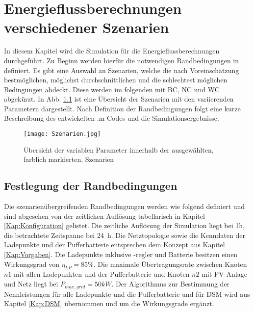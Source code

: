 \chapter{Energieflussberechnungen verschiedener Szenarien}
\label{Kap4}
	In diesem Kapitel wird die Simulation für die Energieflussberechnungen durchgeführt. Zu Beginn werden hierfür die notwendigen Randbedingungen in definiert. Es gibt eine Auswahl an Szenarien, welche die nach Voreinschätzung bestmöglichen, möglichst durchschnittlichen und die schlechtest möglichen Bedingungen abdeckt. Diese werden im folgenden mit \ac{BC}, \ac{NC} und \ac{WC} abgekürzt. In Abb. \ref{Abb:Szenarien} ist eine Übersicht der Szenarien mit den variierenden Parametern dargestellt. Nach Definition der Randbedingungen folgt eine kurze Beschreibung des entwickelten .m-Codes und die Simulationsergebnisse.
    
	
	
	
	
	
	\begin{figure}[h]
		\centering
		\texttt{[image: Szenarien.jpg]}
		\caption{Übersicht der variablen Parameter innerhalb der ausgewählten, farblich markierten, Szenarien}
		\label{Abb:Szenarien}
	\end{figure}

\section{Festlegung der Randbedingungen}
	\label{Kap:Festlegung_Szenarien}
	Die szenarienübergreifenden Randbedingungen werden wie folgend definiert und sind abgesehen von der zeitlichen Auflösung tabellarisch in Kapitel \ref{Kap:Konfiguration} gelistet. Die zeitliche Auflösung der Simulation liegt bei 1h, die betrachtete Zeitspanne bei 24~h. Die Netztopologie sowie die Kenndaten der Ladepunkte und der Pufferbatterie entsprechen dem Konzept aus Kapitel \ref{Kap:Vorgaben}. Die Ladepunkte inklusive -regler und Batterie besitzen einen Wirkungsgrad von $\eta_{LP} = 85 \%$. Die maximale Übertragungsrate zwischen Knoten $n1$ mit allen Ladepunkten und der Pufferbatterie und Knoten $n2$ mit PV-Anlage und Netz liegt bei $P_{max,grid} = 50 kW$. Der Algorithmus zur Bestimmung der Nennleistungen für alle Ladepunkte und die Pufferbatterie und für DSM wird aus Kapitel \ref{Kap:DSM} übernommen und um die Wirkungsgrade ergänzt. 
    
